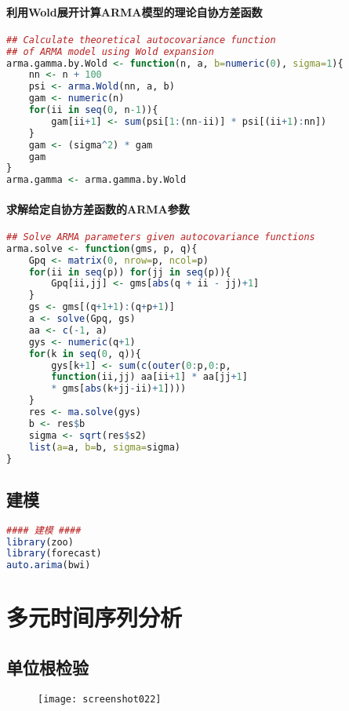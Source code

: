 \documentclass[11pt,a4paper,oneside]{book}
\begin{document}
\subsection{利用Wold展开计算ARMA模型的理论自协方差函数}
\begin{lstlisting}[language=r]
## Calculate theoretical autocovariance function
## of ARMA model using Wold expansion
arma.gamma.by.Wold <- function(n, a, b=numeric(0), sigma=1){
	nn <- n + 100
	psi <- arma.Wold(nn, a, b)
	gam <- numeric(n)
	for(ii in seq(0, n-1)){
		gam[ii+1] <- sum(psi[1:(nn-ii)] * psi[(ii+1):nn])
	}
	gam <- (sigma^2) * gam
	gam
}
arma.gamma <- arma.gamma.by.Wold
\end{lstlisting}
\subsection{求解给定自协方差函数的ARMA参数}
\begin{lstlisting}[language=r]
## Solve ARMA parameters given autocovariance functions
arma.solve <- function(gms, p, q){
	Gpq <- matrix(0, nrow=p, ncol=p)
	for(ii in seq(p)) for(jj in seq(p)){
		Gpq[ii,jj] <- gms[abs(q + ii - jj)+1]
	}
	gs <- gms[(q+1+1):(q+p+1)]
	a <- solve(Gpq, gs)
	aa <- c(-1, a)
	gys <- numeric(q+1)
	for(k in seq(0, q)){
		gys[k+1] <- sum(c(outer(0:p,0:p,
		function(ii,jj) aa[ii+1] * aa[jj+1]
		* gms[abs(k+jj-ii)+1])))
	}
	res <- ma.solve(gys)
	b <- res$b
	sigma <- sqrt(res$s2)
	list(a=a, b=b, sigma=sigma)
}
\end{lstlisting}
\chapter{建模}
\begin{lstlisting}[language=r]
#### 建模 ####
library(zoo)
library(forecast)
auto.arima(bwi)
\end{lstlisting}


\part{多元时间序列分析}
\chapter{单位根检验}
\begin{figure}[H]
	\texttt{[image: screenshot022]}
	\label{fig:screenshot022}
\end{figure}
\end{document}

